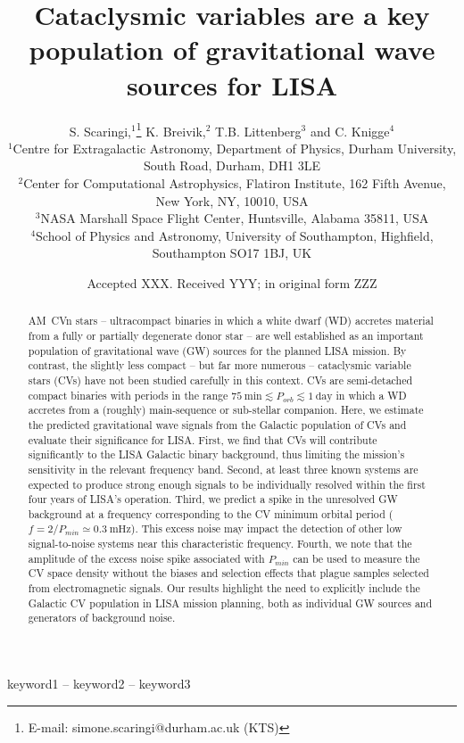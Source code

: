 \documentclass[fleqn,usenatbib]{mnras}
\title[LISA CVs]{Cataclysmic variables are a key population of gravitational wave sources for LISA}
\author[S. Scaringi et al.]{
S. Scaringi,$^{1}$\thanks{E-mail: simone.scaringi@durham.ac.uk (KTS)}
K. Breivik,$^{2}$
T.B. Littenberg$^{3}$
and C. Knigge$^{4}$
\\
$^{1}$Centre for Extragalactic Astronomy, Department of Physics, Durham University, South Road, Durham, DH1 3LE\\
$^{2}$Center for Computational Astrophysics, Flatiron Institute, 162 Fifth Avenue, New York, NY, 10010, USA\\
$^{3}$NASA Marshall Space Flight Center, Huntsville, Alabama 35811, USA\\
$^{4}$School of Physics and Astronomy, University of Southampton, Highfield, Southampton SO17 1BJ, UK
}
\date{Accepted XXX. Received YYY; in original form ZZZ}
\begin{document}
\maketitle

\begin{abstract}
AM~CVn stars -- ultracompact binaries in which a white dwarf (WD) accretes material from a fully or partially degenerate donor star -- are well established as an important population of gravitational wave (GW) sources for the planned LISA mission. By contrast, the slightly less compact -- but far more numerous -- cataclysmic variable stars (CVs) have not been studied carefully in this context.  CVs are semi-detached compact binaries with periods in the range $75~\mathrm{min} \lesssim P_{orb} \lesssim 1~\mathrm{day}$ in which a WD accretes from a (roughly) main-sequence or sub-stellar companion. Here, we estimate the predicted gravitational wave signals from the Galactic population of CVs and evaluate their significance for LISA. First, we find that CVs will contribute significantly to the LISA Galactic binary background, thus limiting the mission's sensitivity in the relevant frequency band. Second, at least three known systems are expected to produce strong enough signals to be individually resolved within the first four years of LISA's operation. Third, we predict a spike in the unresolved GW background at a frequency corresponding to the CV minimum orbital period ($f = 2/P_{min} \simeq 0.3~\mathrm{mHz}$). 
This excess noise may impact the detection of other low signal-to-noise systems near this characteristic frequency. Fourth, we note that the amplitude of the excess noise spike associated with $P_{min}$ can be used to measure the CV space density without the biases and selection effects that plague samples selected from  electromagnetic signals. Our results highlight the need to explicitly include the Galactic CV population in LISA mission planning, both as individual GW sources and generators of background noise. 
\end{abstract}


\begin{keywords}
keyword1 -- keyword2 -- keyword3
\end{keywords}

\end{document}
